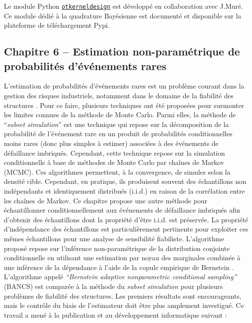 \noindent
{} Le module Python \href{https://efekhari27.github.io/otkerneldesign/master/}{\texttt{otkerneldesign}} est développé en collaboration avec J.Muré. Ce module dédié à la quadrature Bayésienne est documenté et disponible sur la plateforme de téléchargement Pypi. 


\subsection*{Chapitre 6 -- Estimation non-paramétrique de probabilités d'événements rares}

L'estimation de probabilités d'événements rares est un problème courant dans la gestion des risques industriels, notamment dans le domaine de la fiabilité des structures \cite{chabridon_2018_thesis}. 
Pour ce faire, plusieurs techniques ont été proposées pour surmonter les limites connues de la méthode de Monte Carlo. 
Parmi elles, la méthode de ``\textit{subset simulation}'' \cite{AuBeck2001} est une technique qui repose sur la décomposition de la probabilité de l'événement rare en un produit de probabilités conditionnelles moins rares (donc plus simples à estimer) associées à des événements de défaillance imbriqués. 
Cependant, cette technique repose sur la simulation conditionnelle à base de méthodes de Monte Carlo par chaînes de Markov (MCMC). 
Ces algorithmes permettent, à la convergence, de simuler selon la densité cible. 
Cependant, en pratique, ils produisent souvent des échantillons non indépendants et identiquement distribués (i.i.d.) en raison de la corrélation entre les chaînes de Markov. 
Ce chapitre propose une autre méthode pour échantillonner conditionnellement aux événements de défaillance imbriqués afin d'obtenir des échantillons dont la propriété d'être i.i.d. est préservée. 
La propriété d'indépendance des échantillons est particulièrement pertinente pour exploiter ces mêmes échantillons pour une analyse de sensibilité fiabiliste. 
L'algorithme proposé repose sur l'inférence non-paramétrique de la distribution conjointe conditionnelle en utilisant une estimation par noyau des marginales combinée à une inférence de la dépendance à l'aide de la copule empirique de Bernstein \cite{sancetta_satchell_2004}. 
L'algorithme appelé \textit{``Bernstein adaptive nonparametric conditional sampling''} (BANCS) est comparée à la méthode du \textit{subset simulation} pour plusieurs problèmes de fiabilité des structures. 
Les premiers résultats sont encourageants, mais le contrôle du biais de l'estimateur doit être plus amplement investigué. 
Ce travail a mené à la publication et au développement informatique suivant : \\

